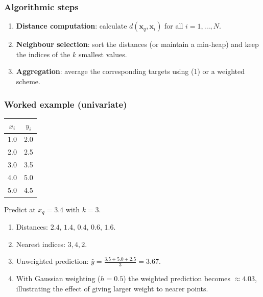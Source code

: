 \documentclass[12pt, a4paper]{article}
\begin{document}
\subsubsection{Algorithmic steps}
\begin{enumerate}
\item \textbf{Distance computation}: calculate \(d(\mathbf{x}_{q},\mathbf{x}_i)\) for all \(i=1,\dots,N\).
\item \textbf{Neighbour selection}: sort the distances (or maintain a min‑heap) and keep the indices of the \(k\) smallest values.
\item \textbf{Aggregation}: average the corresponding targets using (1) or a weighted scheme.
\end{enumerate}

\subsubsection{Worked example (univariate)}
\begin{center}
\begin{tabular}{c|c}
$x_i$ & $y_i$ \\ \hline
1.0 & 2.0 \\
2.0 & 2.5 \\
3.0 & 3.5 \\
4.0 & 5.0 \\
5.0 & 4.5
\end{tabular}
\end{center}
Predict at \(x_q = 3.4\) with \(k=3\).

\begin{enumerate}
\item Distances: \(2.4,\,1.4,\,0.4,\,0.6,\,1.6\).
\item Nearest indices: \(3,4,2\).
\item Unweighted prediction: \(\displaystyle \hat{y}= \frac{3.5+5.0+2.5}{3}=3.67\).
\item With Gaussian weighting (\(h=0.5\)) the weighted prediction becomes \(\approx 4.03\), illustrating the effect of giving larger weight to nearer points.
\end{enumerate}

\vspace{0.5cm}
\end{document}
